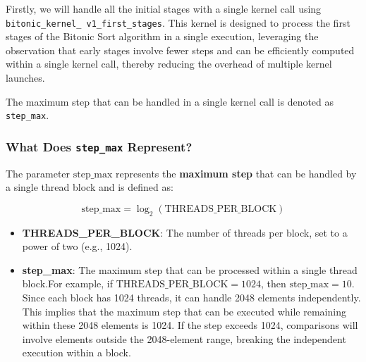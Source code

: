 \documentclass[12pt]{article}
\begin{document}
Firstly, we will handle all the initial stages with a single kernel call using \texttt{bitonic\_kernel\_ v1\_first\_stages}. This kernel is designed to process the first stages of the Bitonic Sort algorithm in a single execution, leveraging the observation that early stages involve fewer steps and can be efficiently computed within a single kernel call, thereby reducing the overhead of multiple kernel launches.

The maximum step that can be handled in a single kernel call is denoted as \texttt{step\_max}. 

\subsubsection{What Does \texttt{step\_max} Represent?}

The parameter \( \text{step\_max} \) represents the \textbf{maximum step} that can be handled by a single thread block and is defined as:

\[
\text{step\_max} = \log_2(\text{THREADS\_PER\_BLOCK})
\]

\begin{itemize}[nosep]
    \item \textbf{THREADS\_PER\_BLOCK}: The number of threads per block, set to a power of two (e.g., 1024).
    \item \textbf{step\_max}: The maximum step that can be processed within a single thread block.For example, if \( \text{THREADS\_PER\_BLOCK} = 1024 \), then \( \text{step\_max} = 10 \). Since each block has 1024 threads, it can handle 2048 elements independently. This implies that the maximum step that can be executed while remaining within these 2048 elements is 1024. If the step exceeds 1024, comparisons will involve elements outside the 2048-element range, breaking the independent execution within a block.
\end{itemize}
\end{document}
